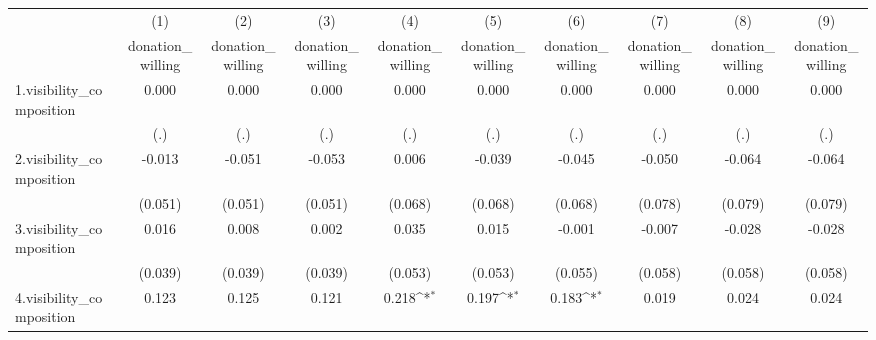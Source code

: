 {
\def\sym#1{\ifmmode^{#1}\else\(^{#1}\)\fi}
\begin{tabular}{l*{9}{c}}
\hline\hline
            &\multicolumn{1}{c}{(1)}&\multicolumn{1}{c}{(2)}&\multicolumn{1}{c}{(3)}&\multicolumn{1}{c}{(4)}&\multicolumn{1}{c}{(5)}&\multicolumn{1}{c}{(6)}&\multicolumn{1}{c}{(7)}&\multicolumn{1}{c}{(8)}&\multicolumn{1}{c}{(9)}\\
            &\multicolumn{1}{c}{donation\_willing}&\multicolumn{1}{c}{donation\_willing}&\multicolumn{1}{c}{donation\_willing}&\multicolumn{1}{c}{donation\_willing}&\multicolumn{1}{c}{donation\_willing}&\multicolumn{1}{c}{donation\_willing}&\multicolumn{1}{c}{donation\_willing}&\multicolumn{1}{c}{donation\_willing}&\multicolumn{1}{c}{donation\_willing}\\
\hline
1.visibility\_composition&       0.000         &       0.000         &       0.000         &       0.000         &       0.000         &       0.000         &       0.000         &       0.000         &       0.000         \\
            &         (.)         &         (.)         &         (.)         &         (.)         &         (.)         &         (.)         &         (.)         &         (.)         &         (.)         \\
[1em]
2.visibility\_composition&      -0.013         &      -0.051         &      -0.053         &       0.006         &      -0.039         &      -0.045         &      -0.050         &      -0.064         &      -0.064         \\
            &     (0.051)         &     (0.051)         &     (0.051)         &     (0.068)         &     (0.068)         &     (0.068)         &     (0.078)         &     (0.079)         &     (0.079)         \\
[1em]
3.visibility\_composition&       0.016         &       0.008         &       0.002         &       0.035         &       0.015         &      -0.001         &      -0.007         &      -0.028         &      -0.028         \\
            &     (0.039)         &     (0.039)         &     (0.039)         &     (0.053)         &     (0.053)         &     (0.055)         &     (0.058)         &     (0.058)         &     (0.058)         \\
[1em]
4.visibility\_composition&       0.123         &       0.125         &       0.121         &       0.218\sym{*}  &       0.197\sym{*}  &       0.183\sym{*}  &       0.019         &       0.024         &       0.024         \\

\end{tabular}}
